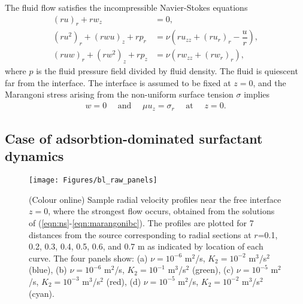 \documentclass[]{jfm}
\begin{document}
The fluid flow satisfies the incompressible Navier-Stokes equations
\begin{subequations}
\label{eqn:ns}
\begin{align}
 (ru)_r + r w_z &= 0, \label{eqn:rmom} \\
 (ru^2)_r + (rwu)_z  + rp_r &= \nu \left( ru_{zz} + (ru_r)_r -\dfrac{u}{r} \right), \label{eqn:zmom} \\
 (ruw)_r  + (rw^2)_z + rp_z &= \nu \left( rw_{zz} + (rw_r)_r \right), \label{eqn:mass}
% 
\end{align}
\end{subequations}
where $p$ is the fluid pressure field divided by fluid density.
The fluid is quiescent far from the interface. 
The interface is assumed to be fixed at $z=0$, and the Marangoni stress arising from the non-uniform surface tension $\sigma$ implies
\begin{align}
 w=0 \quad \text{ and } \quad  \mu u_z = \sigma_r \quad \text{ at } \quad z=0. \label{eqn:nopenetration}
\end{align}

\subsection{Case of adsorbtion-dominated surfactant dynamics}
\label{subsec:caseadsorbed}
\begin{figure}
\centerline{\texttt{[image: Figures/bl\_raw\_panels]}}
\caption{(Colour online) Sample radial velocity profiles near the free interface $z=0$, where the strongest flow occurs, obtained from the solutions of (\ref{eqn:ns}-\ref{eqn:marangonibc}). 
The profiles are plotted for 7 distances from the source corresponding to radial sections at $r$=0.1, 0.2, 0.3, 0.4, 0.5, 0.6, and 0.7 m as indicated by location of each curve. 
The four panels show: (a) $\nu=10^{-6}$ m$^2$/s, $K_2 = 10^{-2}$ m$^3$/s$^2$ (blue), (b) $\nu=10^{-6}$ m$^2$/s, $K_2 = 10^{-1}$ m$^3$/s$^2$ (green), (c) $\nu=10^{-5}$ m$^2$/s, $K_2 = 10^{-3}$ m$^3$/s$^2$ (red), (d) $\nu=10^{-5}$ m$^2$/s, $K_2 = 10^{-2}$ m$^3$/s$^2$ (cyan).}
\label{fig:bl_raw_panels}
\end{figure}
\end{document}

